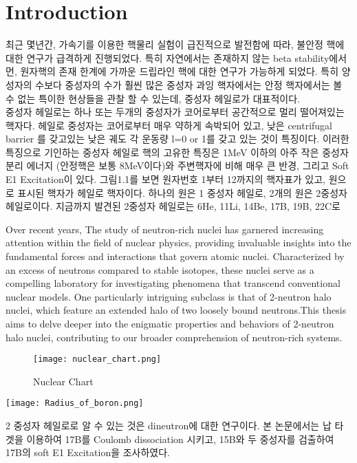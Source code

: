 \chapter{Introduction}
최근 몇년간, 가속기를 이용한 핵물리 실험이 급진적으로 발전함에 따라, 불안정 핵에 대한 연구가 급격하게 진행되었다. 특히 자연에서는 존재하지 않는 beta stability에서 먼, 원자핵의 존재 한계에 가까운 드립라인 핵에 대한 연구가 가능하게 되었다. 특히 양성자의 수보다 중성자의 수가 훨씬 많은 중성자 과잉 핵자에서는 안정 핵자에서는 볼 수 없는 특이한 현상들을 관찰 할 수 있는데, 중성자 헤일로가 대표적이다. \\
\indent 중성자 헤일로는 하나 또는 두개의 중성자가 코어로부터 공간적으로 멀리 떨어져있는 핵자다. 헤일로 중성자는 코어로부터 매우 약하게 속박되어 있고, 낮은 centrifugal barrier 를 갖고있는 낮은 궤도 각 운동량 l=0 or 1를 갖고 있는 것이 특징이다. 이러한 특징으로 기인하는 중성자 헤일로 핵의 고유한 특징은 1MeV 이하의 아주 작은 중성자 분리 에너지 (안정핵은 보통 8MeV이다)와 주변핵자에 비해 매우 큰 반경, 그리고 Soft E1 Excitation이 있다.
그림1.1를 보면 원자번호 1부터 12까지의 핵자표가 있고, 원으로 표시된 핵자가 헤일로 핵자이다. 하나의 원은 1 중성자 헤일로, 2개의 원은 2중성자 헤일로이다. 지금까지 발견된 2중성자 헤일로는 6He, 11Li, 14Be, 17B, 19B, 22C로 

Over recent years, The study of neutron-rich nuclei has garnered increasing attention within the field of nuclear physics, providing invaluable insights into the fundamental forces and interactions that govern atomic nuclei. Characterized by an excess of neutrons compared to stable isotopes, these nuclei serve as a compelling laboratory for investigating phenomena that transcend conventional nuclear models. One particularly intriguing subclass is that of 2-neutron halo nuclei, which feature an extended halo of two loosely bound neutrons.This thesis aims to delve deeper into the enigmatic properties and behaviors of 2-neutron halo nuclei, contributing to our broader comprehension of neutron-rich systems.

\begin{figure}[h]
    \centering
    \texttt{[image: nuclear\_chart.png]}
    \caption{Nuclear Chart}
    \label{Nuclear chart}
\end{figure}
\begin{center}
    \texttt{[image: Radius\_of\_boron.png]}
\end{center}
2 중성자 헤일로로 알 수 있는 것은 dineutron에 대한 연구이다. 
본 논문에서는 납 타겟을 이용하여 17B를 Coulomb dissociation 시키고, 15B와 두 중성자를 검출하여 17B의 soft E1 Excitation을 조사하였다.

